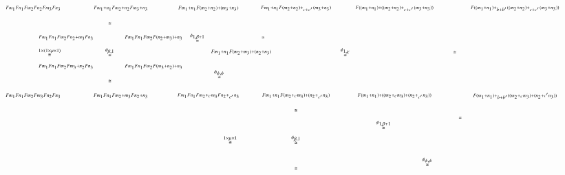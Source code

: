 \documentclass[reqno]{amsart}
\begin{document}
\[\begin{tikzpicture}[scale=1.6]
\node (1) at (1.875,0) {$\scriptscriptstyle{\stackrel{1 \times (1 \times \mu \times 1)} \cong}$};
\node (2) at (3.25,0) {$\scriptscriptstyle{\stackrel{\phi_{\beta,1}} \cong}$};
\node (3) at (3.25,.66) {$\scriptscriptstyle{\cong}$};
\node (4) at (3.25,-.66) {$\scriptscriptstyle{\cong}$};
\node (5) at (5.75,-.5) {$\scriptscriptstyle{\stackrel{\phi_{\psi,\psi}} \cong}$};
\node (6) at (5.25,.33) {$\scriptscriptstyle{\stackrel{\phi_{1,\beta+1}} \cong}$};
\node (7) at (6.75,.33) {$\scriptscriptstyle{\cong}$};
\node (8) at (8.625,0) {$\scriptscriptstyle{\stackrel{\phi_{1,\chi}} \cong}$};
\node (9) at (11.125,0) {$\scriptscriptstyle{\cong}$};
\node (B) at (1.5,1) {$\scriptscriptstyle{Fm_1 Fn_1 Fm_2 Fn_2 Fm_3 Fn_3}$};
\node (B') at (3.5,1) {$\scriptscriptstyle{Fm_1+n_1 Fm_2+n_2 Fm_3+n_3}$};
\node (B'') at (5.5,1) {$\scriptscriptstyle{Fm_1+n_1 F(m_2+n_2)+(m_3+n_3)}$};
\node (B''') at (7.5,1) {$\scriptscriptstyle{Fm_1+n_1 F(m_2+n_2)+_{c+c'}(m_3+n_3)}$};
\node (B'''') at (9.75,1) {$\scriptscriptstyle{F((m_1+n_1)+((m_2+n_2)+_{c+c'}(m_3+n_3))}$};
\node (B''''') at (12.5,1) {$\scriptscriptstyle{F((m_1+n_1)+_{b+b'}((m_2+n_2)+_{c+c'}(m_3+n_3))}$};
\node (X) at (2.25,.33) {$\scriptscriptstyle{Fm_1 Fn_1 Fm_2 Fn_2+m_3 Fn_3}$};
\node (X') at (4.25,.33) {$\scriptscriptstyle{Fm_1 Fn_1 Fm_2 F(n_2+m_3)+n_3}$};
\node (X'') at (2.25,-.33) {$\scriptscriptstyle{Fm_1 Fn_1 Fm_2 Fm_3+n_2 Fn_3}$};
\node (X''') at (4.25,-.33) {$\scriptscriptstyle{Fm_1 Fn_1 Fm_2 F(m_3+n_2)+n_3}$};
\node (J) at (6.25,0) {$\scriptscriptstyle{Fm_1+n_1 F(m_2+m_3)+(n_2+n_3)}$};
\node (1') at (6,-2) {$\scriptscriptstyle{\stackrel{1 \times \mu \times 1} \cong}$};
\node (2') at (7.5,-2) {$\scriptscriptstyle{\stackrel{\phi_{\beta,1}} \cong}$};
\node (3') at (7.5,-1.33) {$\scriptscriptstyle{\cong}$};
\node (4') at (7.5,-2.66) {$\scriptscriptstyle{\cong}$};
\node (5') at (9.5,-1.66) {$\scriptscriptstyle{\stackrel{\phi_{1,\beta+1}} \cong}$};
\node (6') at (11.25,-1.5) {$\scriptscriptstyle{\cong}$};
\node (7') at (10.5,-2.5) {$\scriptscriptstyle{\stackrel{\phi_{\psi,\psi}} \cong}$};

\node (C) at (1.5,-1) {$\scriptscriptstyle{Fm_1 Fn_1 Fm_2 Fm_3 Fn_2 Fn_3}$};
\node (C') at (3.5,-1) {$\scriptscriptstyle{Fm_1 Fn_1 Fm_2+m_3 Fn_2+n_3}$};
\node (C'') at (5.5,-1) {$\scriptscriptstyle{Fm_1 Fn_1 Fm_2+_c m_3 Fn_2+_{c'}n_3}$};
\node (C''') at (7.5,-1) {$\scriptscriptstyle{Fm_1+n_1 F(m_2+_c m_3)+(n_2+_{c'}n_3)}$};
\node (C'''') at (9.75,-1) {$\scriptscriptstyle{F(m_1+n_1)+((m_2+_c m_3)+(n_2+_{c'}n_3))}$};
\node (C''''') at (12.5,-1) {$\scriptscriptstyle{F(m_1+n_1)+_{b+b'}((m_2+_c m_3)+(n_2+{c'}n_3))}$};


\end{tikzpicture}\]
\end{document}
